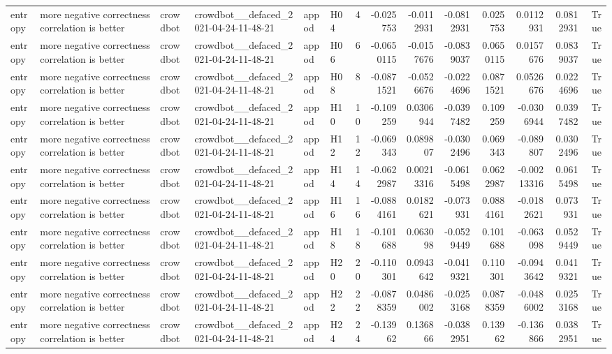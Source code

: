\begin{longtable}{llllllrrrrrrrr}
entropy & more negative correctness correlation is better & crowdbot & crowdbot\_\_defaced\_2021-04-24-11-48-21 & appod & H04 & 4 & -0.025753 & -0.0112931 & -0.0812931 & 0.025753 & 0.0112931 & 0.0812931 & True \\
entropy & more negative correctness correlation is better & crowdbot & crowdbot\_\_defaced\_2021-04-24-11-48-21 & appod & H06 & 6 & -0.0650115 & -0.0157676 & -0.0839037 & 0.0650115 & 0.0157676 & 0.0839037 & True \\
entropy & more negative correctness correlation is better & crowdbot & crowdbot\_\_defaced\_2021-04-24-11-48-21 & appod & H08 & 8 & -0.0871521 & -0.0526676 & -0.0224696 & 0.0871521 & 0.0526676 & 0.0224696 & True \\
entropy & more negative correctness correlation is better & crowdbot & crowdbot\_\_defaced\_2021-04-24-11-48-21 & appod & H10 & 10 & -0.109259 & 0.0306944 & -0.0397482 & 0.109259 & -0.0306944 & 0.0397482 & True \\
entropy & more negative correctness correlation is better & crowdbot & crowdbot\_\_defaced\_2021-04-24-11-48-21 & appod & H12 & 12 & -0.069343 & 0.089807 & -0.0302496 & 0.069343 & -0.089807 & 0.0302496 & True \\
entropy & more negative correctness correlation is better & crowdbot & crowdbot\_\_defaced\_2021-04-24-11-48-21 & appod & H14 & 14 & -0.0622987 & 0.00213316 & -0.0615498 & 0.0622987 & -0.00213316 & 0.0615498 & True \\
entropy & more negative correctness correlation is better & crowdbot & crowdbot\_\_defaced\_2021-04-24-11-48-21 & appod & H16 & 16 & -0.0884161 & 0.0182621 & -0.073931 & 0.0884161 & -0.0182621 & 0.073931 & True \\
entropy & more negative correctness correlation is better & crowdbot & crowdbot\_\_defaced\_2021-04-24-11-48-21 & appod & H18 & 18 & -0.101688 & 0.063098 & -0.0529449 & 0.101688 & -0.063098 & 0.0529449 & True \\
entropy & more negative correctness correlation is better & crowdbot & crowdbot\_\_defaced\_2021-04-24-11-48-21 & appod & H20 & 20 & -0.110301 & 0.0943642 & -0.0419321 & 0.110301 & -0.0943642 & 0.0419321 & True \\
entropy & more negative correctness correlation is better & crowdbot & crowdbot\_\_defaced\_2021-04-24-11-48-21 & appod & H22 & 22 & -0.0878359 & 0.0486002 & -0.0253168 & 0.0878359 & -0.0486002 & 0.0253168 & True \\
entropy & more negative correctness correlation is better & crowdbot & crowdbot\_\_defaced\_2021-04-24-11-48-21 & appod & H24 & 24 & -0.13962 & 0.136866 & -0.0382951 & 0.13962 & -0.136866 & 0.0382951 & True \\

\end{longtable}
